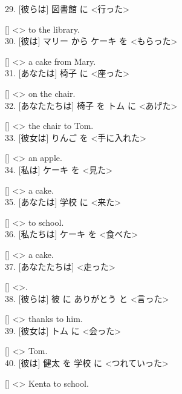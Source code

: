 \documentclass[uplatex,
paper=a4,
fontsize=18pt,
jafontsize=16pt,
number_of_lines=30,
line_length=30zh,
baselineskip=25pt,
]{jlreq}
\begin{document}
29.  [彼らは] 図書館 に <行った>

  [\hspace{3em}] <\hspace{3em}> to the library.
\\

30.  [彼は] マリー から ケーキ を <もらった>

  [\hspace{3em}] <\hspace{3em}> a cake from Mary.
\\

31.  [あなたは] 椅子 に <座った>

  [\hspace{3em}] <\hspace{3em}> on the chair.
\\

32.  [あなたたちは] 椅子 を トム に <あげた>

  [\hspace{3em}] <\hspace{3em}> the chair to Tom.
\\

33.  [彼女は] りんご を <手に入れた>

  [\hspace{3em}] <\hspace{3em}> an apple.
\\

34.  [私は] ケーキ を <見た>

  [\hspace{3em}] <\hspace{3em}> a cake.
\\

35.  [あなたは] 学校 に <来た>

  [\hspace{3em}] <\hspace{3em}> to school.
\\

36.  [私たちは] ケーキ を <食べた>

  [\hspace{3em}] <\hspace{3em}> a cake.
\\

37.  [あなたたちは] <走った>

  [\hspace{3em}] <\hspace{3em}>.
\\

38.  [彼らは] 彼 に ありがとう と <言った>

  [\hspace{3em}] <\hspace{3em}> thanks to him.
\\

39.  [彼女は] トム に <会った>

  [\hspace{3em}] <\hspace{3em}> Tom.
\\

40.  [彼は] 健太 を 学校 に <つれていった>

  [\hspace{3em}] <\hspace{3em}> Kenta to school.
\\
\end{document}
